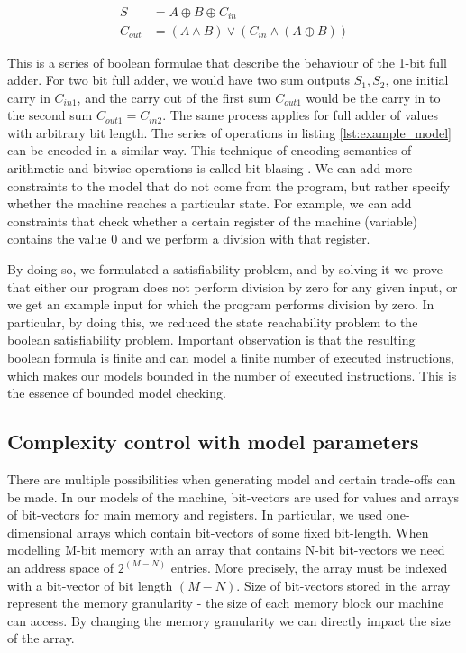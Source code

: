 \documentclass[12pt]{article}
\begin{document}
\begin{align*}
    S	    &= A \oplus B \oplus C_{in} \\
    C_{out} &= (A \land B) \lor (C_{in} \land (A \oplus B))
\end{align*}

This is a series of boolean formulae that describe the behaviour of the 1-bit
full adder. For two bit full adder, we would have two sum outputs $S_1, S_2$,
one initial carry in $C_{in1}$, and the carry out of the first sum $C_{out1}$
would be the carry in to the second sum $C_{out1} = C_{in2}$. The same process
applies for full adder of values with arbitrary bit length. The series of
operations in listing \ref{lst:example_model} can be encoded in a similar
way. This technique of encoding semantics of arithmetic and bitwise operations
is called bit-blasing \cite{barrett2021satisfiability}. We can add more
constraints to the model that do not come from the program, but rather specify
whether the machine reaches a particular state. For example, we can add
constraints that check whether a certain register of the machine (variable)
contains the value $0$ and we perform a division with that register. 

By doing so, we formulated a satisfiability problem, and by solving it we prove
that either our program does not perform division by zero for any given input,
or we get an example input for which the program performs division by zero. In
particular, by doing this, we reduced the state reachability problem to the
boolean satisfiability problem. Important observation is that the resulting 
boolean formula is finite and can model a finite number of executed
instructions, which makes our models bounded in the number of executed
instructions. This is the essence of bounded model checking.


\subsection{Complexity control with model parameters}

There are multiple possibilities when generating model and certain trade-offs
can be made. In our models of the machine, bit-vectors are used for values and
arrays of bit-vectors for main memory and registers. In particular, we used
one-dimensional arrays which contain bit-vectors of some fixed bit-length. When
modelling M-bit memory with an array that contains N-bit bit-vectors we need an
address space of $2^{(M - N)}$ entries. More precisely, the array must be
indexed with a bit-vector of bit length $(M - N)$. Size of bit-vectors stored
in the array represent the memory granularity - the size of each memory block
our machine can access. By changing the memory granularity we can directly
impact the size of the array.
\end{document}

